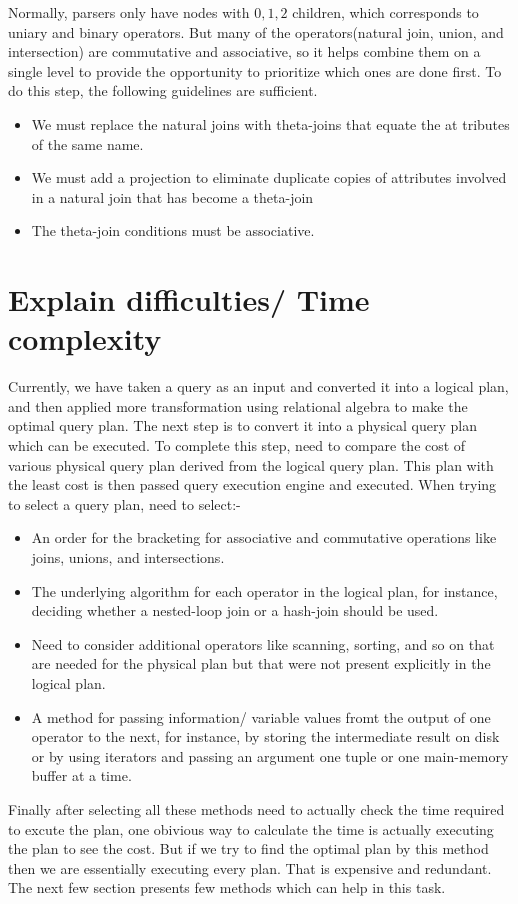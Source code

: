 \par Normally, parsers only have nodes with $0, 1, 2$ children, which corresponds to uniary and binary operators. But many of the operators(natural join, union, and intersection) are commutative and associative, so it helps combine them on a single level to provide the opportunity to prioritize which ones are done first. To do this step, the following guidelines are sufficient.
\begin{itemize}
    \item We must replace the natural joins with theta-joins that equate the at­ tributes of the same name.
    \item We must add a projection to eliminate duplicate copies of attributes in­volved in a natural join that has become a theta-join
    \item The theta-join conditions must be associative.
\end{itemize}


\section{Explain difficulties/ Time complexity}
Currently, we have taken a query as an input and converted it into a logical plan, and then applied more transformation using relational algebra to make the optimal query plan. The next step is to convert it into a physical query plan which can be executed. To complete this step, need to compare the cost of various physical query plan derived from the logical query plan. This plan with the least cost is then passed query execution engine and executed. When trying to select a query plan, need to select:-
\begin{itemize}
    \item An order for the bracketing for associative and commutative operations like joins, unions, and intersections.
    \item The underlying algorithm for each operator in the logical plan, for instance, deciding whether a nested-loop join or a hash-join should be used.
    \item Need to consider additional operators like scanning, sorting, and so on that are needed for the physical plan but that were not present explicitly in the logical plan.
    \item A method for passing information/ variable values fromt the output of one operator to the next, for instance, by storing the intermediate result on disk or by using iterators and passing an argument one tuple or one main-memory buffer at a time.
\end{itemize}
Finally after selecting all these methods need to actually check the time required to excute the plan, one obivious way to calculate the time is actually executing the plan to see the cost. But if we try to find the optimal plan by this method then we are essentially executing every plan. That is expensive and redundant. The next few section presents few methods which can help in this task.

